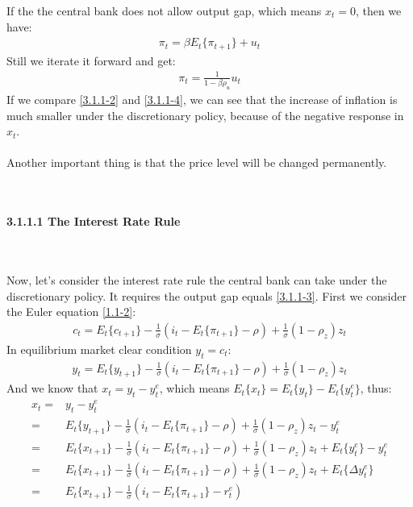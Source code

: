 \documentclass{article}
\numberwithin{equation}{section}
\begin{document}
If the the central bank does not allow output gap, which means $x_t = 0$, then we have:
	\begin{align*}
		\pi_t = \beta E_t\{ \pi_{t+1} \} + u_t
	\end{align*}
Still we iterate it forward and get:
	\begin{align}
		\pi_t = \frac{1}{1 - \beta\rho_u}u_t \label{3.1.1-4}
	\end{align}
If we compare \eqref{3.1.1-2} and \eqref{3.1.1-4}, we can see that the increase of inflation is much smaller under the discretionary policy, because of the negative response in $x_t$.\\\\
Another important thing is that the price level will be changed permanently.\\\\\\
\centerline{\textbf{3.1.1.1 The Interest Rate Rule}}\\\\
Now, let's consider the interest rate rule the central bank can take under the discretionary policy. It requires the output gap equals \eqref{3.1.1-3}. First we consider the Euler equation \eqref{1.1-2}:
	\begin{align*}
		c_t = E_t\{ c_{t+1} \} - \frac{1}{\sigma}(i_t - E_t\{ \pi_{t+1} \} - \rho) + \frac{1}{\sigma}(1 - \rho_z)z_t
	\end{align*}
In equilibrium market clear condition $y_t = c_t$:
	\begin{align*}
		y_t = E_t\{ y_{t+1} \} - \frac{1}{\sigma}(i_t - E_t\{ \pi_{t+1} \} - \rho) + \frac{1}{\sigma}(1 - \rho_z)z_t
	\end{align*}
And we know that $x_t = y_t - y^e_t$, which means $E_t\{ x_t \} = E_t\{ y_t \} - E_t\{ y^e_t \}$, thus:
	\begin{align}
		x_t = &y_t - y^e_t \nonumber\\
		= &E_t\{ y_{t+1} \} - \frac{1}{\sigma}(i_t - E_t\{ \pi_{t+1} \} - \rho) + \frac{1}{\sigma}(1 - \rho_z)z_t - y^e_t \nonumber\\
		= &E_t\{ x_{t+1} \} - \frac{1}{\sigma}(i_t - E_t\{ \pi_{t+1} \} - \rho) + \frac{1}{\sigma}(1 - \rho_z)z_t + E_t\{ y^e_t \} - y^e_t \nonumber\\
		= &E_t\{ x_{t+1} \} - \frac{1}{\sigma}(i_t - E_t\{ \pi_{t+1} \} - \rho) + \frac{1}{\sigma}(1 - \rho_z)z_t + E_t\{ \Delta y^e_t \} \nonumber\\
		= &E_t\{ x_{t+1} \} - \frac{1}{\sigma}(i_t - E_t\{ \pi_{t+1} \} - r^e_t)\label{3.1.1.1-1}
	\end{align}
\end{document}
